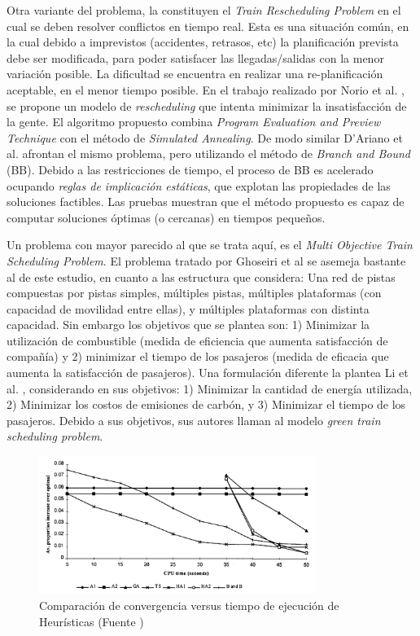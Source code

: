 \documentclass[letter, 10pt]{article}
\begin{document}
\begin{description}
    Otra variante del problema, la constituyen el \textit{Train Rescheduling Problem} en el cual se deben resolver conflictos en tiempo real. Esta es una situación común, en la cual debido a imprevistos (accidentes, retrasos, etc) la planificación prevista debe ser modificada, para poder satisfacer las llegadas/salidas con la menor variación posible. La dificultad se encuentra en realizar una re-planificación aceptable, en el menor tiempo posible. En el trabajo realizado por Norio et al. \cite{Norio}, se propone un modelo de \textit{rescheduling} que intenta minimizar la insatisfacción de la gente. El algoritmo propuesto combina \textit{Program Evaluation and Preview Technique} con el método de \textit{Simulated Annealing}. De modo similar D'Ariano et al. \cite{DAriano} afrontan el mismo problema, pero utilizando el método de \textit{Branch and Bound} (BB). Debido a las restricciones de tiempo, el proceso de BB es acelerado ocupando \textit{reglas de implicación estáticas}, que explotan las propiedades de las soluciones factibles. Las pruebas muestran que el método propuesto es capaz de computar soluciones óptimas (o cercanas) en tiempos pequeños.

    Un problema con mayor parecido al que se trata aquí, es el \textit{Multi Objective Train Scheduling Problem}. El problema tratado por Ghoseiri et al \cite{Ghoseiri} se asemeja bastante al de este estudio, en cuanto a las estructura que considera: Una red de pistas compuestas por pistas simples, múltiples pistas, múltiples plataformas (con capacidad de movilidad entre ellas), y múltiples plataformas con distinta capacidad. Sin embargo los objetivos que se plantea son: 1) Minimizar la utilización de combustible (medida de eficiencia que aumenta satisfacción de compañía) y 2) minimizar el tiempo de los pasajeros (medida de eficacia que aumenta la satisfacción de pasajeros). Una formulación diferente la plantea Li et al. \cite{Li}, considerando en sus objetivos: 1) Minimizar la cantidad de energía utilizada, 2) Minimizar los costos de emisiones de carbón, y 3) Minimizar el tiempo de los pasajeros. Debido a sus objetivos, sus autores llaman al modelo \textit{green train scheduling problem}.   

    \begin{figure}[htpb!]
    \centering
    \includegraphics[width=9cm]{timecomp}
    \caption{Comparación de convergencia versus tiempo de ejecución de Heurísticas (Fuente \cite{Higgins})}
    \label{fig:timecomp}
    \end{figure}
\end{description}
\end{document}
